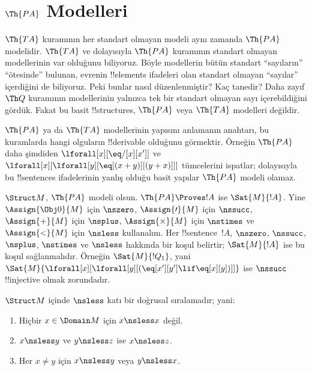 

\section{$\Th{PA}$ Modelleri}

\begin{explain}
$\Th{TA}$ kuramının her standart olmayan modeli aynı zamanda
$\Th{PA}$ modelidir. $\Th{TA}$ ve dolayısıyla $\Th{PA}$ kuramının
standart olmayan modellerinin var olduğunu biliyoruz. Böyle modellerin
bütün standart ``sayıların'' ``ötesinde'' bulunan, evrenin
!!{element}s ifadeleri olan standart olmayan ``sayılar'' içerdiğini de
biliyoruz. Peki bunlar nasıl düzenlenmiştir? Kaç tanedir? Daha zayıf
$\Th Q$ kuramının modellerinin yalnızca tek bir standart olmayan sayı
içerebildiğini gördük. Fakat bu basit !!{structure}s, $\Th{PA}$ veya
$\Th{TA}$ modelleri değildir.

$\Th{PA}$ ya da $\Th{TA}$ modellerinin yapısını anlamanın anahtarı,
bu kuramlarda hangi olguların !!{derivable} olduğunu görmektir.
Örneğin $\Th{PA}$ daha şimdiden
$\lforall[x][\eq/[x][x']]$ ve
$\lforall[x][\lforall[y][\eq[(x+y)][(y+x)]]]$ tümcelerini ispatlar;
dolayısıyla bu !!{sentence}s ifadelerinin yanlış olduğu basit yapılar
$\Th{PA}$ modeli olamaz.

$\Struct M$, $\Th{PA}$ modeli olsun. $\Th{PA}\Proves !A$ ise
$\Sat{M}{!A}$. Yine $\Assign{\Obj0}{M}$ için $\nszero$,
$\Assign{\prime}{M}$ için $\nssucc$, $\Assign{+}{M}$ için $\nsplus$,
$\Assign{\times}{M}$ için $\nstimes$ ve $\Assign{<}{M}$ için
$\nsless$ kullanalım. Her !!{sentence}~$!A$, $\nszero$, $\nssucc$,
$\nsplus$, $\nstimes$ ve $\nsless$ hakkında bir koşul belirtir;
$\Sat{M}{!A}$ ise bu koşul sağlanmalıdır. Örneğin $\Sat{M}{!Q_1}$,
yani
$\Sat{M}{\lforall[x][\lforall[y][(\eq[x'][y']\lif\eq[x][y])]]}$
ise $\nssucc$ !!{injective} olmak zorundadır.
\end{explain}

\begin{prop}
$\Struct M$ içinde $\nsless$ katı bir doğrusal sıralamadır; yani:
\begin{enumerate}
\item Hiçbir $x\in\Domain M$ için $x\nsless x$ değil.
\item $x\nsless y$ ve $y\nsless z$ ise $x\nsless z$.
\item Her $x\neq y$ için $x\nsless y$ veya $y\nsless x$.
\end{enumerate}
\end{prop}

